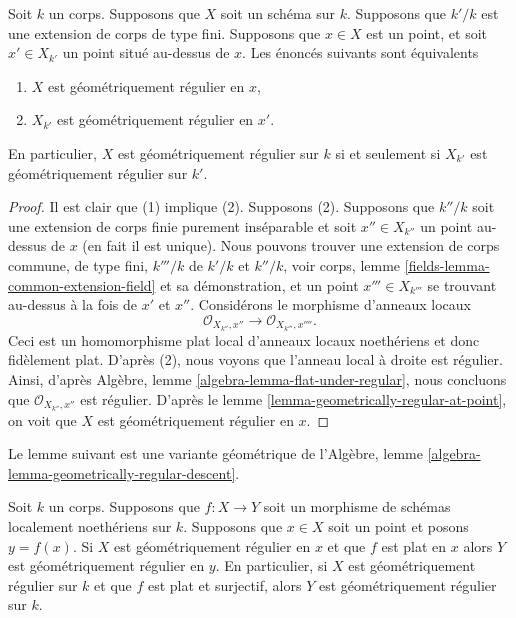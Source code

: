 \begin{lemma}
\label{lemma-geometrically-regular-upstairs}
Soit $k$ un corps. Supposons que $X$ soit
un schéma sur $k$. Supposons que $k'/k$ est une
extension de corps de type fini. Supposons que $x \in
X$ est un point, et soit $x' \in X_{k'}$ un point situé
au-dessus de $x$. Les énoncés suivants sont équivalents
\begin{enumerate}
\item $X$ est géométriquement régulier en $x$,
\item $X_{k'}$ est géométriquement régulier en $x'$.
\end{enumerate}
En particulier, $X$ est géométriquement régulier sur $k$ si et
seulement si $X_{k'}$ est géométriquement régulier sur $k'$.
\end{lemma}

\begin{proof}
Il est clair que (1) implique (2). Supposons (2). Supposons que
$k''/k$ soit une extension de corps finie purement inséparable
et soit $x'' \in X_{k''}$ un point au-dessus de $x$ (en fait il
est unique). Nous pouvons trouver une extension de corps
commune, de type fini, $k'''/k$ de $k'/k$ et $k''/k$, voir
corps, lemme \ref{fields-lemma-common-extension-field} et sa
démonstration, et un point $x''' \in X_{k'''}$ se trouvant au-dessus
à la fois de $x'$ et $x''$. Considérons le morphisme d’anneaux locaux
$$
\mathcal{O}_{X_{k''}, x''} \longrightarrow \mathcal{O}_{X_{k'''}, x''''}.
$$
Ceci est un homomorphisme plat local d'anneaux locaux
noethériens et donc fidèlement plat. D'après (2), nous
voyons que l'anneau local à droite est régulier. Ainsi,
d'après Algèbre, lemme
\ref{algebra-lemma-flat-under-regular}, nous concluons que
$\mathcal{O}_{X_{k''}, x''}$ est régulier. D'après le lemme
\ref{lemma-geometrically-regular-at-point}, on voit que $X$ est géométriquement régulier en $x$.
\end{proof}

\noindent
Le lemme suivant est une variante géométrique de
l'Algèbre, lemme \ref{algebra-lemma-geometrically-regular-descent}.

\begin{lemma}
\label{lemma-flat-under-geometrically-regular}
Soit $k$ un corps. Supposons que $f : X \to Y$
soit un morphisme de schémas localement noethériens sur $k$.
Supposons que $x \in X$ soit un point et posons $y = f(x)$. Si
$X$ est géométriquement régulier en $x$ et que $f$ est plat en
$x$ alors $Y$ est géométriquement régulier en $y$. En
particulier, si $X$ est géométriquement régulier sur $k$ et que $f$
est plat et surjectif, alors $Y$ est géométriquement régulier sur $k$.
\end{lemma}

